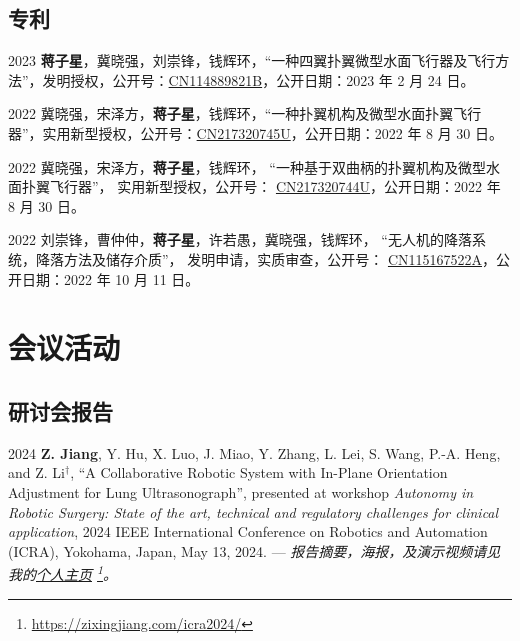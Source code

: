 \documentclass[utf8, 11pt,letterpaper]{report}
\begin{document}
\subsection*{专利}
\begin{tablist}		
	\item[2023]   \tab{}\textbf{蒋子星}，冀晓强，刘崇锋，钱辉环，``一种四翼扑翼微型水面飞行器及飞行方法''，发明授权，公开号：\href{https://www.patentguru.com/cn/CN114889821B}{CN114889821B}，公开日期：2023 年 2 月 24 日。
	
	\item[2022]   \tab{}冀晓强，宋泽方，\textbf{蒋子星}，钱辉环，``一种扑翼机构及微型水面扑翼飞行器''，实用新型授权，公开号：\href{https://www.patentguru.com/cn/CN217320745U}{CN217320745U}，公开日期：2022 年 8 月 30 日。 
	
	\item[2022]   \tab{}冀晓强，宋泽方，\textbf{蒋子星}，钱辉环， ``一种基于双曲柄的扑翼机构及微型水面扑翼飞行器''， 实用新型授权，公开号： \href{https://www.patentguru.com/cn/CN217320744U}{CN217320744U}，公开日期：2022 年 8 月 30 日。 
	
	\item[2022]   \tab{}刘崇锋，曹仲仲，\textbf{蒋子星}，许若愚，冀晓强，钱辉环， ``无人机的降落系统，降落方法及储存介质''， 发明申请，实质审查，公开号： \href{https://www.patentguru.com/cn/CN115167522A}{CN115167522A}，公开日期：2022 年 10 月 11 日。
\end{tablist}
	
	
	
\section*{会议活动}
\subsection*{研讨会报告}
\begin{tablist}
	\item[2024] \tab \textbf{Z. Jiang}, Y. Hu, X. Luo, J. Miao, Y. Zhang, L. Lei, S. Wang, P.-A. Heng, and Z. Li$^\dagger$, ``A Collaborative Robotic System with In-Plane Orientation Adjustment for Lung Ultrasonograph'', presented at workshop \textit{Autonomy in Robotic Surgery: State of the art, technical and regulatory challenges for clinical application}, 2024 IEEE International Conference on Robotics and Automation (ICRA), Yokohama, Japan, May 13, 2024. --- \emph{报告摘要，海报，及演示视频请见我的\href{https://zixingjiang.com/icra2024/}{个人主页} \footnote{\href{https://zixingjiang.com/icra2024/}{https://zixingjiang.com/icra2024/}}。}
\end{tablist}
	
\end{document}
